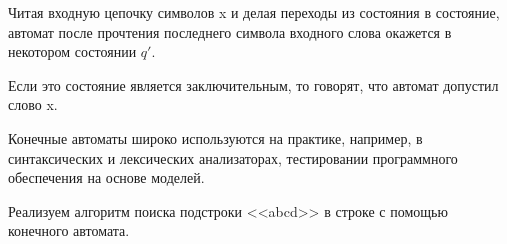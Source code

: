 \documentclass[a4paper,12pt]{article}
\begin{document}
	Читая входную цепочку символов x и делая переходы из состояния в состояние, автомат после прочтения последнего символа входного слова окажется в некотором состоянии $q'$.
	
	Если это состояние является заключительным, то говорят, что автомат допустил слово x.
	
	Конечные автоматы широко используются на практике, например, в синтаксических и лексических анализаторах, тестировании программного обеспечения на основе моделей.
	
	Реализуем алгоритм поиска подстроки <<abcd>> в строке с помощью конечного автомата.
	
	
	
	
\end{document}
